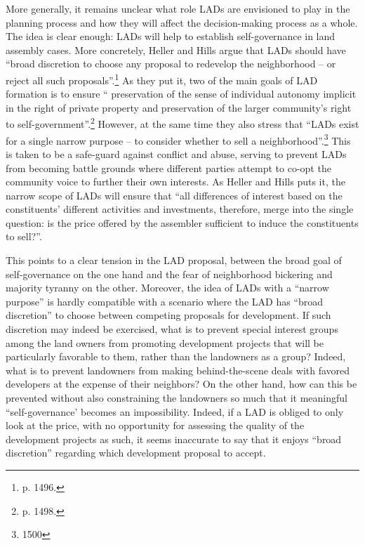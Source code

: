 More generally, it remains unclear what role LADs are envisioned to play in the planning process and how they will affect the decision-making process as a whole. The idea is clear enough: LADs will help to establish self-governance in land assembly cases. More concretely, Heller and Hills argue that LADs should have ``broad discretion to choose any proposal to redevelop the neighborhood -- or reject all such proposals''.\footnote{p. 1496.} As they put it, two of the main goals of LAD formation is to ensure `` preservation of the sense of individual autonomy implicit in the right of private property and preservation of the larger community's right to self-government''.\footnote{p. 1498.} However, at the same time they also stress that ``LADs exist for a single narrow purpose -- to consider whether to sell a neighborhood''.\footnote{1500} This is taken to be a safe-guard against conflict and abuse, serving to prevent LADs from becoming battle grounds where different parties attempt to co-opt the community voice to further their own interests. As Heller and Hills puts it, the narrow scope of LADs will ensure that ``all differences of interest based on the constituents' different activities and investments, therefore, merge into the single question: is the price offered by the assembler sufficient to induce the constituents to sell?''.

This points to a clear tension in the LAD proposal, between the broad goal of self-governance on the one hand and the fear of neighborhood bickering and majority tyranny on the other. Moreover, the idea of LADs with a ``narrow purpose'' is hardly compatible with a scenario where the LAD has ``broad discretion'' to choose between competing proposals for development. If such discretion may indeed be exercised, what is to prevent special interest groups among the land owners from promoting development projects that will be particularly favorable to them, rather than the landowners as a group? Indeed, what is to prevent landowners from making behind-the-scene deals with favored developers at the expense of their neighbors? On the other hand, how can this be prevented without also constraining the landowners so much that it meaningful ``self-governance' becomes an impossibility. Indeed, if a LAD is obliged to only look at the price, with no opportunity for assessing the quality of the development projects as such, it seems inaccurate to say that it enjoys ``broad discretion'' regarding which development proposal to accept. 

